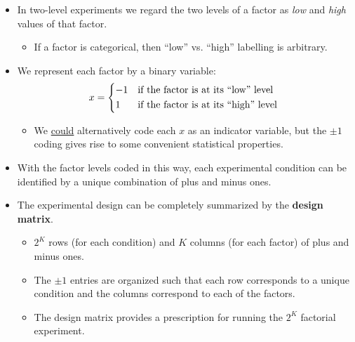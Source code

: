\begin{itemize}
    \item In two-level experiments we regard the two levels of a factor as \emph{low} and \emph{high} values of that factor.
          \begin{itemize}
              \item If a factor is categorical, then ``low'' vs. ``high'' labelling is arbitrary.
          \end{itemize}
    \item We represent each factor by a binary variable:
          \[ x=\begin{cases*}
                  -1 & if the factor is at its ``low'' level  \\
                  1  & if the factor is at its ``high'' level
              \end{cases*} \]
          \begin{itemize}[*]
              \item We \underline{could} alternatively code each $ x $ as an indicator variable, but the $ \pm 1 $ coding
                    gives rise to some convenient statistical properties.
          \end{itemize}
\end{itemize}
\begin{itemize}[$\rightarrow$]
    \item With the factor levels coded in this way, each experimental condition can be identified by a unique
          combination of plus and minus ones.
\end{itemize}
\begin{itemize}
    \item The experimental design can be completely summarized by the \textbf{design matrix}.
          \begin{itemize}
              \item $ 2^K $ rows (for each condition) and $ K $ columns (for each factor) of plus and minus ones.
          \end{itemize}
          \begin{itemize}[$\rightarrow$]
              \item The $ \pm 1 $ entries are organized such that each row corresponds to a unique condition and the
                    columns correspond to each of the factors.
              \item The design matrix provides a prescription for running the $2^K$ factorial experiment.
          \end{itemize}
\end{itemize}
